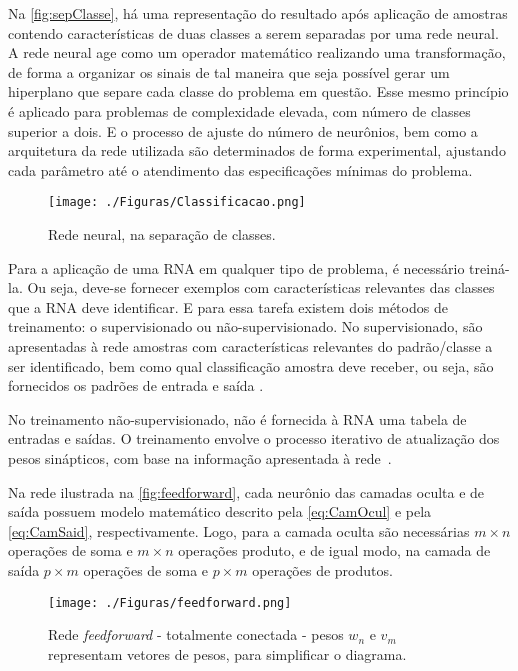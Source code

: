 Na \autoref{fig:sepClasse}, há uma representação do resultado após aplicação de amostras contendo características de duas classes a serem separadas por uma rede neural. A rede neural age como um operador matemático realizando uma transformação, de forma a organizar os sinais de tal maneira que seja possível gerar um hiperplano que separe cada classe do problema em questão. Esse mesmo princípio é aplicado para problemas de complexidade elevada, com número de classes superior a dois. E o processo de ajuste do número de neurônios, bem como a arquitetura da rede utilizada são determinados de forma experimental, ajustando cada parâmetro até o atendimento das especificações mínimas do problema.

\begin{figure}[H]
	\begin{center}   
		\caption{Rede neural, na separação de classes.}
		\label{fig:sepClasse}
		\texttt{[image: ./Figuras/Classificacao.png]}
	\end{center}
\end{figure}

Para a aplicação de uma RNA em qualquer tipo de problema, é necessário treiná-la. Ou seja,  deve-se fornecer exemplos com características relevantes das classes que a RNA deve identificar. E para essa tarefa existem dois métodos de treinamento: o supervisionado ou não-supervisionado. No supervisionado, são apresentadas à rede amostras com características relevantes do padrão/classe a ser identificado, bem como qual classificação amostra deve receber, ou seja, são fornecidos os padrões de entrada e saída \cite{book:simonhaykin2008, book:braga2007}. 

No treinamento não-supervisionado, não é fornecida à RNA uma tabela de entradas e saídas. O treinamento envolve o processo iterativo de atualização dos pesos sinápticos, com base na informação apresentada à rede~\cite{book:simonhaykin2008, book:braga2007}.

Na rede ilustrada na \autoref{fig:feedforward}, cada neurônio das camadas oculta e de saída possuem modelo matemático descrito pela \autoref{eq:CamOcul} e pela \autoref{eq:CamSaid}, respectivamente. Logo, para a camada oculta são necessárias $m\times n$ operações de soma e $m\times{n}$ operações produto, e de igual modo, na camada de saída $p\times m$ operações de soma e $p\times{m}$ operações de produtos.

\begin{figure}[H]
	\begin{center}
		\caption{Rede \textit{feedforward} - totalmente conectada - pesos $w_n$ e $v_m$ representam vetores de pesos, para simplificar o diagrama.}
		\label{fig:feedforward}
		\texttt{[image: ./Figuras/feedforward.png]}%
	\end{center}
\end{figure}

